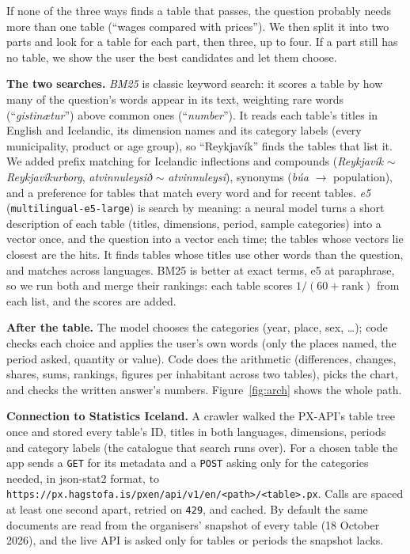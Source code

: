 \documentclass[10pt,a4paper]{article}
\begin{document}
If none of the three ways finds a table that passes, the question probably needs more than one table (``wages
compared with prices''). We then split it into two parts and look for a table for each part, then three, up to four.
If a part still has no table, we show the user the best candidates and let them choose.

\textbf{The two searches.} \emph{BM25} is classic keyword search: it scores a table by how many of the question's
words appear in its text, weighting rare words (``\emph{gistinætur}'') above common ones (``\emph{number}''). It reads
each table's titles in English and Icelandic, its dimension names and its category labels (every municipality,
product or age group), so ``Reykjavík'' finds the tables that list it. We added prefix matching for Icelandic
inflections and compounds (\emph{Reykjavík} $\sim$ \emph{Reykjavíkurborg}, \emph{atvinnuleysið} $\sim$ \emph{atvinnuleysi}), synonyms (\emph{búa} $\rightarrow$ population), and a
preference for tables that match every word and for recent tables. \emph{e5} (\texttt{multilingual-e5-large}) is
search by meaning: a neural model turns a short description of each table (titles, dimensions, period, sample
categories) into a vector once, and the question into a vector each time; the tables whose vectors lie closest are the
hits. It finds tables whose titles use other words than the question, and matches across languages. BM25 is better at
exact terms, e5 at paraphrase, so we run both and merge their rankings: each table scores $1/(60+\text{rank})$ from
each list, and the scores are added.

\textbf{After the table.} The model chooses the categories (year, place, sex, \dots); code checks each choice and
applies the user's own words (only the places named, the period asked, quantity or value). Code does the arithmetic
(differences, changes, shares, sums, rankings, figures per inhabitant across two tables), picks the chart, and checks
the written answer's numbers. Figure~\ref{fig:arch} shows the whole path.

\textbf{Connection to Statistics Iceland.} A crawler walked the PX-API's table tree once and stored every table's
ID, titles in both languages, dimensions, periods and category labels (the catalogue that search runs over). For a
chosen table the app sends a \texttt{GET} for its metadata and a \texttt{POST} asking only for the categories needed,
in json-stat2 format, to \texttt{https://px.hagstofa.is/pxen/api/v1/en/<path>/<table>.px}. Calls are spaced at least
one second apart, retried on \texttt{429}, and cached. By default the same documents are read from the organisers'
snapshot of every table (18 October 2026), and the live API is asked only for tables or periods the snapshot lacks.
\end{document}
